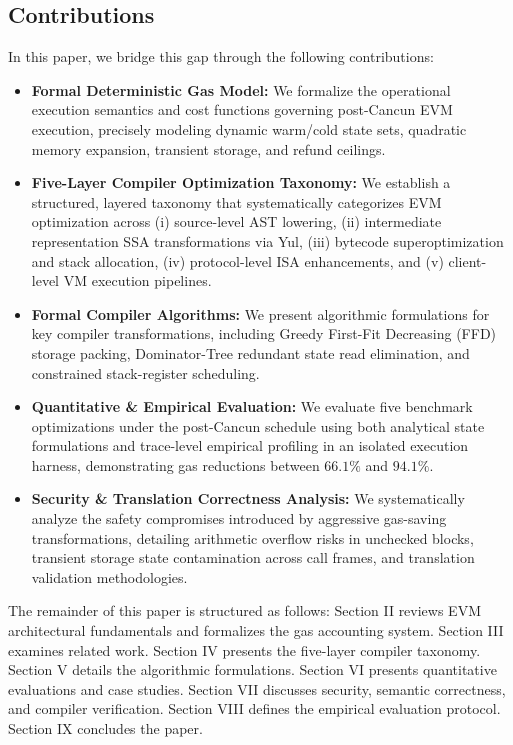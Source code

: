 \documentclass[conference]{IEEEtran}
\begin{document}
\subsection{Contributions}
In this paper, we bridge this gap through the following contributions:
\begin{itemize}
    \item \textbf{Formal Deterministic Gas Model:} We formalize the operational execution semantics and cost functions governing post-Cancun EVM execution, precisely modeling dynamic warm/cold state sets, quadratic memory expansion, transient storage, and refund ceilings.
    \item \textbf{Five-Layer Compiler Optimization Taxonomy:} We establish a structured, layered taxonomy that systematically categorizes EVM optimization across (i) source-level AST lowering, (ii) intermediate representation SSA transformations via Yul, (iii) bytecode superoptimization and stack allocation, (iv) protocol-level ISA enhancements, and (v) client-level VM execution pipelines.
    \item \textbf{Formal Compiler Algorithms:} We present algorithmic formulations for key compiler transformations, including Greedy First-Fit Decreasing (FFD) storage packing, Dominator-Tree redundant state read elimination, and constrained stack-register scheduling.
    \item \textbf{Quantitative \& Empirical Evaluation:} We evaluate five benchmark optimizations under the post-Cancun schedule using both analytical state formulations and trace-level empirical profiling in an isolated execution harness, demonstrating gas reductions between $66.1\%$ and $94.1\%$.
    \item \textbf{Security \& Translation Correctness Analysis:} We systematically analyze the safety compromises introduced by aggressive gas-saving transformations, detailing arithmetic overflow risks in unchecked blocks, transient storage state contamination across call frames, and translation validation methodologies.
\end{itemize}

The remainder of this paper is structured as follows: Section II reviews EVM architectural fundamentals and formalizes the gas accounting system. Section III examines related work. Section IV presents the five-layer compiler taxonomy. Section V details the algorithmic formulations. Section VI presents quantitative evaluations and case studies. Section VII discusses security, semantic correctness, and compiler verification. Section VIII defines the empirical evaluation protocol. Section IX concludes the paper.
\end{document}
